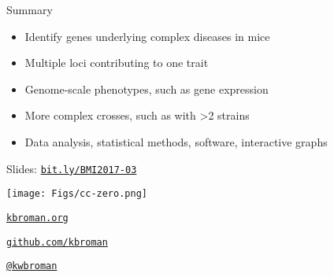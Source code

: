 \documentclass[12pt,t]{beamer}
\begin{document}
\begin{frame}[c]{Summary}

  \begin{itemize}
   \itemsep12pt
    \item Identify genes underlying complex diseases in mice
    \item Multiple loci contributing to one trait
    \item Genome-scale phenotypes, such as gene expression
    \item More complex crosses, such as with >2 strains
    \item Data analysis, statistical methods, software, interactive graphs
  \end{itemize}

\end{frame}

\begin{frame}[c]{}

\large

\vspace*{10mm}
Slides: \href{http://bit.ly/BMI2017-03}{\tt bit.ly/BMI2017-03}

\vspace*{-5mm}
\hspace{90mm} \texttt{[image: Figs/cc-zero.png]}

\vspace{2mm}

\href{http://kbroman.org}{\tt kbroman.org}

\vspace{2mm}

\href{https://github.com/kbroman}{\tt github.com/kbroman}

\vspace{2mm}

\href{https://twitter.com/kwbroman}{\tt @kwbroman}


\end{frame}
\end{document}
